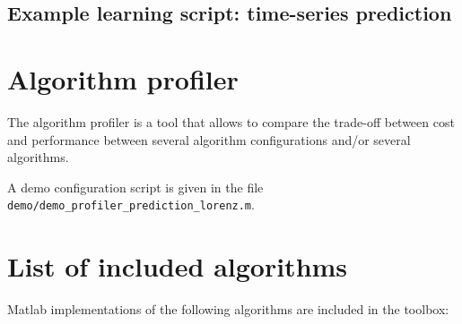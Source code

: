 \documentclass[]{report}
\begin{document}
\section{Example learning script: time-series prediction}




\chapter{Algorithm profiler}
\label{sec:profiler}

The algorithm profiler is a tool that allows to compare the trade-off between cost and performance between several algorithm configurations and/or several algorithms.

A demo configuration script is given in the file\\ \verb"demo/demo_profiler_prediction_lorenz.m".


\chapter{List of included algorithms}
\label{chap:algos}

Matlab implementations of the following algorithms are included in the toolbox:
\end{document}
